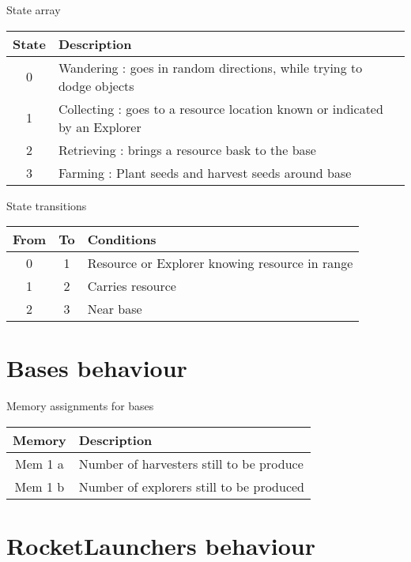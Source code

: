 \documentclass{article}
\begin{document}
\begin{table}[ht]
	State array\\
	\begin{tabular}{|c|l|}
		\hline
		State & Description \\
		\hline
		0 & Wandering : goes in random directions, while trying to dodge objects\\
		\hline
		1 & Collecting : goes to a resource location known or indicated by an Explorer\\
		\hline
		2 & Retrieving : brings a resource bask to the base\\
		\hline
		3 & Farming : Plant seeds and harvest seeds around base\\
		\hline
	\end{tabular}
\end{table}

\begin{table}[ht]
	State transitions\\
	\begin{tabular}{|c|c|l|}
		\hline
		From & To & Conditions\\
		\hline
		0 & 1 & Resource or Explorer knowing resource in range\\
		\hline
		1 & 2 & Carries resource\\
		\hline
		2 & 3 & Near base\\
		\hline
	\end{tabular}
\end{table}

\section{Bases behaviour}

\begin{table}[ht]
	Memory assignments for bases\\
	\begin{tabular}{|c|l|}
		\hline
		Memory & Description\\
		\hline
		Mem 1 a & Number of harvesters still to be produce\\
		Mem 1 b & Number of explorers still to be produced\\
		\hline
	\end{tabular}
\end{table}

\section{RocketLaunchers behaviour}
\end{document}
